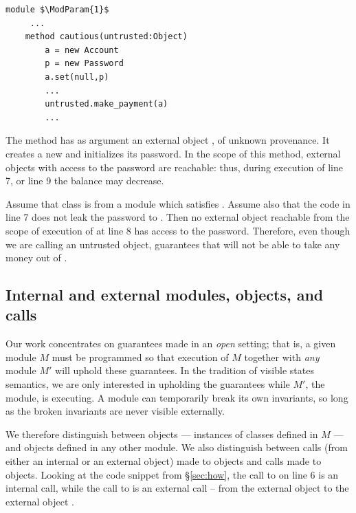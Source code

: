 \begin{lstlisting}[mathescape=true, language=chainmail, frame=lines]
module $\ModParam{1}$
     ...
    method cautious(untrusted:Object)
        a = new Account
        p = new Password
        a.set(null,p)
        ...
        untrusted.make_payment(a)
        ...
\end{lstlisting}
 

{The method  has as  argument an external object , of unknown provenance.
{It} creates a new  and initializes its password. 
In the scope of  this method,  external objects with access to the password are reachable:
thus,  during execution of  line 7, or   line {9} the balance may decrease.
}

{Assume that class  is from a module which satisfies \SrobustB. 
Assume also that the code in line 7 does not leak the password to . Then no external object
reachable from the scope of execution of  at line 8 has access to the password.
Therefore, 
even though we are calling   an untrusted object, \SrobustB guarantees that 
 will not be able to take any money out of  .
 }
 
 

 
\subsection{Internal and external modules, objects, and calls}
\label{s:concepts}

Our work concentrates on guarantees made in an \emph{open} setting; that is, a given module
$M$ must be programmed so that 
execution of $M$ together with \emph{any} \externalM 
module $M'$ will uphold these guarantees. In the tradition of
visible states semantics, we are  only interested in upholding the guarantees while 
$M'$, the  \emph{\externalM} module, is executing. A module can
temporarily break its own invariants,
so long as the broken invariants are never visible externally.
   
We therefore distinguish between  \emph{\internalO}
objects --- instances of classes defined in $M$ ---
and \emph{\externalO} objects defined in any other module.
We also distinguish between
  \emph{\internalC} calls  (from either an internal or an external object)  made %
 to \internalO objects and \emph{\externalC} calls made %
 to \externalC objects. 
{Looking at the code snippet from \S \ref{sec:how}, the call to  on line 6 is an 
 internal call, while the call to  is an external call -- from the external 
 object    to the external object .}
 
